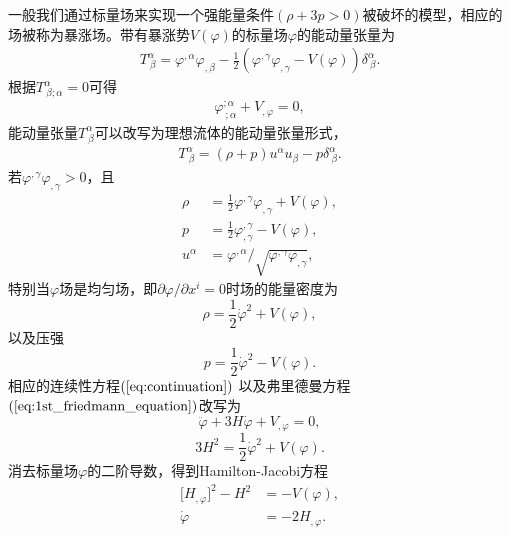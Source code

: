 一般我们通过标量场来实现一个强能量条件$(\rho+3p >
0)$被破坏的模型，相应的场被称为暴涨场。带有暴涨势$V(\varphi)$的标量场$\varphi$的能动量张量为
\begin{align}
  \label{eq:scalar-energy-momentum-tensor}
  T^{\alpha}_{\ \beta} = \varphi^{,\alpha}\varphi_{,\beta}-
  \frac{1}{2}{\left(\varphi^{,\gamma}\varphi_{,\gamma}-V(\varphi)\right)}\delta^{\alpha}_{\
  \beta}.
\end{align}
根据$T^{\alpha}_{\ \beta;\alpha}=0$可得
\begin{align}
  \varphi^{;\alpha}_{\ ;\alpha}+V_{,\varphi}
  =0,
\end{align}
能动量张量$T^{\alpha}_{\
\beta}$可以改写为理想流体的能动量张量形式，
\begin{align}
  \label{eq:perfect-fluid-energy-momentum-tensor}
  T^{\alpha}_{\ \beta}=(\rho+p)u^{\alpha}u_{\beta}-p\delta^{\alpha}_{\
  \beta}.
\end{align}
若$\varphi^{,\gamma}\varphi_{,\gamma}>0$，且
\begin{align}
  \rho &= \frac{1}{2}\varphi^{,\gamma}\varphi_{,\gamma}+V(\varphi),\\
  p&= \frac{1}{2}\varphi^{,\gamma}_{,\gamma}-V(\varphi), \\
  u^{\alpha}&= \varphi^{,\alpha}/
  \sqrt{\varphi^{,\gamma}\varphi_{,\gamma}},
\end{align}
特别当$\varphi$场是均匀场，即$\partial\varphi /\partial x^{i}=0$时场的能量密度为
\begin{equation}\label{eq:energy_density}
  \rho = \frac{1}{2}\dot{\varphi}^2+V(\varphi),
\end{equation}
以及压强
\begin{equation}\label{eq:pressure}
  p=\frac{1}{2}\dot{\varphi}^2-V(\varphi).
\end{equation}
相应的连续性方程$(\ref{eq:continuation})$
以及弗里德曼方程$(\ref{eq:1st_friedmann_equation})$改写为
\begin{equation}
  \label{eq:continuation_in_inflation}
  \ddot{\varphi}+3H\dot\varphi+V_{,\varphi}=0,
\end{equation}
\begin{equation}
  \label{eq:1st_friedmann_equation_in_inflation}
  3H^2=\frac{1}{2}\dot\varphi^2+V(\varphi).
\end{equation}
消去标量场$\varphi$的二阶导数，得到Hamilton-Jacobi方程
\begin{align}
  \lbrack H_{,\varphi} \rbrack^2 - H^2 &=
  -V(\varphi)\label{HJa}, \\
  \dot\varphi  &= -2H_{,\varphi} \label{HJb}.
\end{align}

